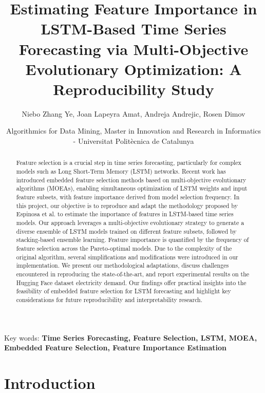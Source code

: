 \documentclass[12pt]{article}
\title{Estimating Feature Importance in LSTM-Based Time Series Forecasting via Multi-Objective Evolutionary Optimization: A Reproducibility Study}
\author{Niebo Zhang Ye, Joan Lapeyra Amat, Andreja Andrejic, Rosen Dimov}
\date{Algorithmics for Data Mining, Master in Innovation and Research in Informatics - Universitat Politècnica de Catalunya }
\begin{document}
\maketitle

\maketitle

\begin{abstract}
Feature selection is a crucial step in time series forecasting, particularly for complex models such as Long Short-Term Memory (LSTM) networks. Recent work has introduced embedded feature selection methods based on multi-objective evolutionary algorithms (MOEAs), enabling simultaneous optimization of LSTM weights and input feature subsets, with feature importance derived from model selection frequency. In this project, our objective is to reproduce and adapt the methodology proposed by Espinosa et al. to estimate the importance of features in LSTM-based time series models. Our approach leverages a multi-objective evolutionary strategy to generate a diverse ensemble of LSTM models trained on different feature subsets, followed by stacking-based ensemble learning. Feature importance is quantified by the frequency of feature selection across the Pareto-optimal models. Due to the complexity of the original algorithm, several simplifications and modifications were introduced in our implementation. We present our methodological adaptations, discuss challenges encountered in reproducing the state-of-the-art, and report experimental results on the Hugging Face dataset electricity demand. Our findings offer practical insights into the feasibility of embedded feature selection for LSTM forecasting and highlight key considerations for future reproducibility and interpretability research.
\end{abstract}

\begin{flushleft}
\end{flushleft}

\begin{flushleft}
Key words:\textbf{ Time Series Forecasting, Feature Selection, LSTM, MOEA, Embedded Feature Selection, Feature Importance Estimation }
\end{flushleft}

\section{Introduction}
\end{document}
